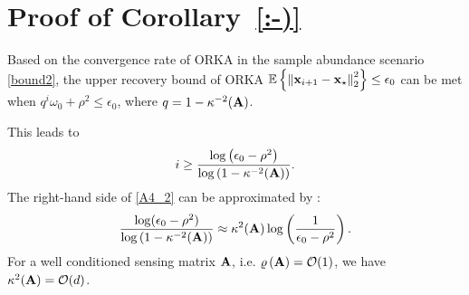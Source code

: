 \documentclass[12pt,draftcls,onecolumn]{IEEEtran}
\begin{document}
\section{Proof of Corollary~\ref{:-)}}
\label{A4}

Based on the convergence rate of ORKA in the sample abundance scenario \eqref{bound2},
the upper recovery bound of ORKA $\mathbb{E}\left\{\left\|\mathbf{x}_{i+1}-\mathbf{x}_{\star}\right\|^2_2\right\}\leq \epsilon_0$ can be met when $q^i\omega_0+\rho^2\leq\epsilon_0$, where $q=1-\kappa^{-2}(\mathbf{A})$.

This leads to
\begin{equation}
\label{A4_2}
i\geq\frac{\log\left(\epsilon_0-\rho^2\right)}{\log\left(1-\kappa^{-2}(\mbA)\right)}.
\end{equation}
The right-hand side of \eqref{A4_2} can be approximated by \cite{strohmer2009randomized}:
\begin{equation}
\label{A4_3}
\frac{\log(\epsilon_0-\rho^2)}{\log\left(1-\kappa^{-2}(\mbA)\right)}\approx\kappa^2(\mbA)\log\left(\frac{1}{\epsilon_0-\rho^2}\right).
\end{equation}
For a well conditioned sensing matrix $\mathbf{A}$, i.e. $\varrho\left(\mathbf{A}\right)=\mathcal{O}(1)$, we have $\kappa^2(\mathbf{A})=\mathcal{O}(d)$. 
\end{document}
